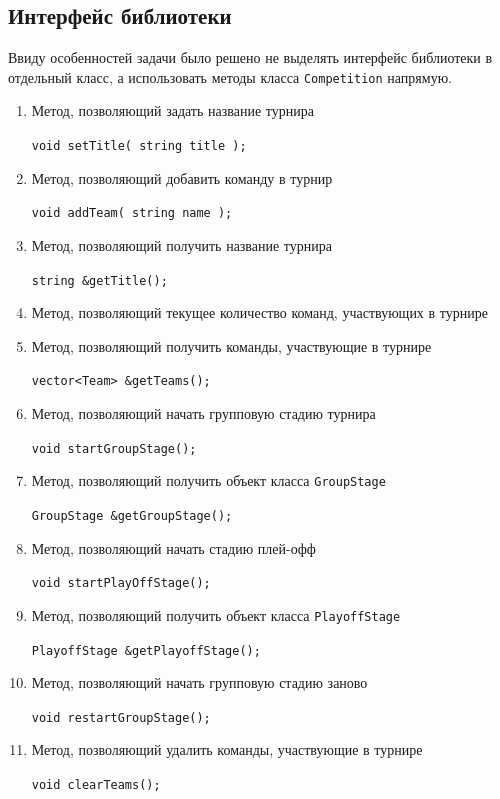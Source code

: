 \subsection{Интерфейс библиотеки}

Ввиду особенностей задачи было решено не выделять интерфейс библиотеки в отдельный класс, а использовать методы класса \verb+Competition+ напрямую.

\begin{enumerate}
    \item Метод, позволяющий задать название турнира
    
    \verb+void setTitle( string title );+


    \item Метод, позволяющий добавить команду в турнир

    \verb+void addTeam( string name );+


    \item Метод, позволяющий получить название турнира

    \verb+string &getTitle();+    


    \item Метод, позволяющий текущее количество команд, участвующих в турнире



    \item Метод, позволяющий получить команды, участвующие в турнире

    \verb+vector<Team> &getTeams();+


    \item Метод, позволяющий начать групповую стадию турнира

    \verb+void startGroupStage();+ 
    
    
    \item Метод, позволяющий получить объект класса \verb+GroupStage+
    
    \verb+GroupStage &getGroupStage();+


    \item Метод, позволяющий начать стадию плей-офф

    \verb+void startPlayOffStage();+


    \item Метод, позволяющий получить объект класса \verb+PlayoffStage+
    
    \verb+PlayoffStage &getPlayoffStage();+   


    \item Метод, позволяющий начать групповую стадию заново

    \verb+void restartGroupStage();+


    \item Метод, позволяющий удалить команды, участвующие в турнире

    \verb+void clearTeams();+
\end{enumerate}

